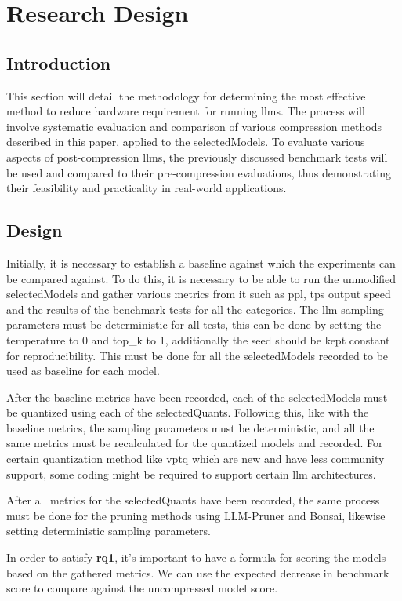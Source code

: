 \documentclass{ifacconf}
\begin{document}
	
	\section{Research Design}
	\subsection{Introduction}
	This section will detail the methodology for determining the most effective method to reduce hardware requirement for running \glspl{llm}. The process will involve systematic evaluation and comparison of various compression methods described in this paper, applied to the \gls{selectedModels}. To evaluate various aspects of post-compression \glspl{llm}, the previously discussed benchmark tests will be used and compared to their pre-compression evaluations, thus demonstrating their feasibility and practicality in real-world applications.
	
	\subsection{Design}
	Initially, it is necessary to establish a baseline against which the experiments can be compared against. To do this, it is necessary to be able to run the unmodified \gls{selectedModels} and gather various metrics from it such as \gls{ppl}, \gls{tps} output speed and the results of the benchmark tests for all the categories. The \gls{llm} sampling parameters must be deterministic for all tests, this can be done by setting the temperature to 0 and top\_k to 1, additionally the seed should be kept constant for reproducibility. This must be done for all the \gls{selectedModels} recorded to be used as baseline for each model.
	
	After the baseline metrics have been recorded, each of the \gls{selectedModels} must be quantized using each of the \gls{selectedQuants}. Following this, like with the baseline metrics, the sampling parameters must be deterministic, and all the same metrics must be recalculated for the quantized models and recorded. For certain quantization method like \gls{vptq} which are new and have less community support, some coding might be required to support certain \gls{llm} architectures.
	
	After all metrics for the \gls{selectedQuants} have been recorded, the same process must be done for the pruning methods using LLM-Pruner and Bonsai, likewise setting deterministic sampling parameters.
	
	In order to satisfy \textbf{\gls{rq}1}, it's important to have a formula for scoring the models based on the gathered metrics. We can use the expected decrease in benchmark score to compare against the uncompressed model score. 
	
\end{document}
